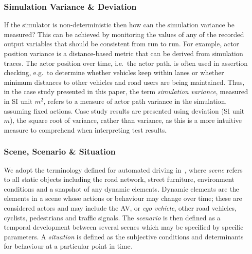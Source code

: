 \documentclass[runningheads,twocolumn,a4paper,10pt]{llncs}
\begin{document}
\subsubsection{Simulation Variance \& Deviation}
If the simulator is non-deterministic then how can the simulation variance be measured? This can be achieved by monitoring the values of any of the recorded output variables that should be consistent from run to run. 
For example, actor position variance is a distance-based metric that can be derived from simulation traces. The actor position over time, i.e.\ the actor path, is often used in assertion checking, e.g.\ to determine whether vehicles keep within lanes or whether minimum distances to other vehicles and road users are being maintained. 
% 
Thus, in the case study presented in this paper, the term \textit{simulation variance}, measured in SI unit $m^2$, refers to a measure of actor path variance in the simulation, assuming fixed actions. 
%
%
Case study results are presented using deviation (SI unit $m$), the square root of variance, rather than variance, as this is a more intuitive measure to comprehend when interpreting test results.
%
\\

\subsubsection{Scene, Scenario \& Situation}
We adopt the terminology defined for automated driving in~\cite{Ulbrich2015}, where \textit{scene} refers to all static objects including the road network, street furniture, environment conditions and a snapshot of any dynamic elements. Dynamic elements are the elements in a scene whose actions or behaviour may change over time; these are considered actors and may include the AV, or \textit{ego vehicle}, other road vehicles, cyclists, pedestrians and traffic signals. The \textit{scenario} is then defined as a temporal development between several scenes which may be specified by specific parameters. A \textit{situation} is defined as the subjective conditions and determinants for behaviour at a particular point in time.
\end{document}
